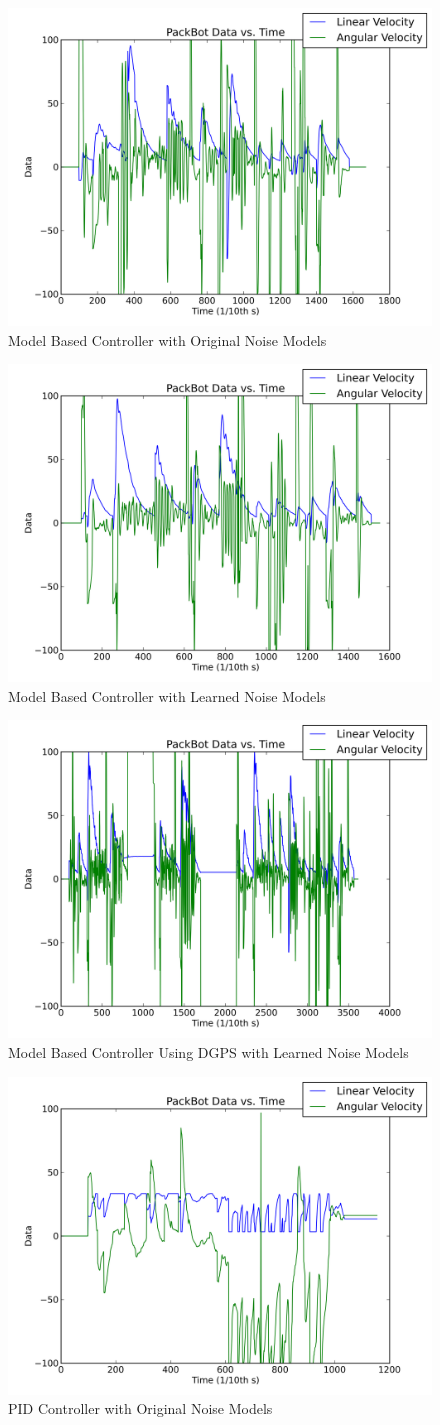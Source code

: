 \begin{figure}[ht!]
	\centering
	\includegraphics[width=.5\textwidth]{images/pbtx/20101203_1551_pbtxLyapOrigQR}
	\caption{Model Based Controller with Original Noise Models}
	\label{fig:resultsLyapunov1}
\end{figure}

\begin{figure}[ht!]
	\centering
	\includegraphics[width=.5\textwidth]{images/pbtx/20101203_1545_pbtxLyapNewQR}
	\caption{Model Based Controller with Learned Noise Models}
	\label{fig:resultsLyapunov2}
\end{figure}

\begin{figure}[ht!]
	\centering
	\includegraphics[width=.5\textwidth]{images/pbtx/20101203_1606_pbtxLyapUsingDgpsNewQR}
	\caption{Model Based Controller Using DGPS with Learned Noise Models}
	\label{fig:resultsLyapunov3}
\end{figure}

\begin{figure}[ht!]
	\centering
	\includegraphics[width=.5\textwidth]{images/pbtx/20101203_1755_pbtxPidOrigQR}
	\caption{PID Controller with Original Noise Models}
	\label{fig:resultsLyapunov4}
\end{figure}

